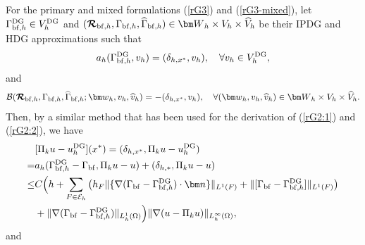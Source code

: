\documentclass[1996/10/24]{amsart}
\theoremstyle{definition}
\numberwithin{equation}{section}
\begin{document}
For the primary and mixed formulations (\ref{rG3}) and (\ref{rG3-mixed}), let $\Gamma_{{\rm bf},h}^{{\rm DG}}\in V_h^{{\rm DG}}$ and $(\boldsymbol{\mathcal{R}}_{{\rm bf},h},\Gamma_{{\rm bf},h},\widehat{\Gamma}_{{\rm bf},h})\in {\bm W}_h\times V_h\times\widehat{V}_h$ be their IPDG and HDG
approximations such that
\begin{align}
a_h(\Gamma_{{\rm bf},h}^{{\rm DG}},v_h)=(\delta_{h,x^{\ast}},v_h),\quad \forall v_h\in V_h^{{\rm DG}},\label{rG3-DG}
\end{align}
and
\begin{align}
\mathcal{B}(\boldsymbol{\mathcal{R}}_{{\rm bf},h},\Gamma_{{\rm bf},h},\widehat{\Gamma}_{{\rm bf},h};{\bm w}_h,v_h,\widehat{v}_h)=
-(\delta_{h,x^{\ast}},v_h),\quad \forall ({\bm w}_h,v_h,\widehat{v}_h)\in {\bm W}_h\times V_h\times \widehat{V}_h.\label{rG3-HDG}
\end{align}
Then, by a similar method that has been used for the derivation of (\ref{rG2:1}) and (\ref{rG2:2}), we have
\begin{align}
&[\Pi_ku-u_h^{{\rm DG}}](x^{\ast})=(\delta_{h,x^{\ast}},\Pi_ku-u_h^{{\rm DG}})\nonumber\\
=&a_h(\Gamma_{{\rm bf},h}^{{\rm DG}}-\Gamma_{{\rm bf}},\Pi_ku-u)+(\delta_{h,\ast},\Pi_ku-u)\nonumber\\
\leq&C\Big(h+\sum_{F\in\mathcal{E}_h}\left(h_F\|\{\nabla(\Gamma_{{\rm bf}}-\Gamma_{{\rm bf},h}^{{\rm DG}})\cdot{\bm n}\}\|_{L^1(F)}+\|[\Gamma_{{\rm bf}}-\Gamma_{{\rm bf},h}^{{\rm DG}}]\|_{L^1(F)}\right)\label{rG3:1}\\
&+\|\nabla(\Gamma_{{\rm bf}}-\Gamma_{{\rm bf},h}^{{\rm DG}})\|_{L_h^1(\Omega)}\Big)\|\nabla(u-\Pi_ku)\|_{L_h^{\infty}(\Omega)},\nonumber
\end{align}
and
\end{document}

